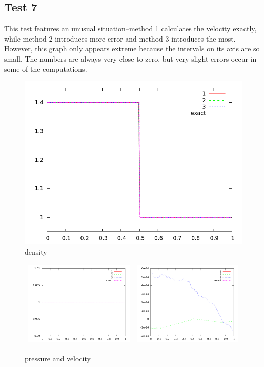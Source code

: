 \documentclass[10pt,preprint]{aastex}
\begin{document}
\clearpage

\subsection{Test 7}
This test features an unusual situation--method 1 calculates the velocity exactly, while method 2 introduces more error and method 3 introduces the most. However, this graph only appears extreme because the intervals on its axis are so small. The numbers are always very close to zero, but very slight errors occur in some of the computations. 

\begin{figure}[h]
  \begin{center}
     \includegraphics[width=.78\textwidth]{den_T7.png}	
  \end{center}
  \caption{density}
\end{figure}

\begin{figure}
  \begin{center}
	\begin{tabular}{cc}
      \includegraphics[width=.425\textwidth]{prs_T7.png} &
	  \includegraphics[width=.425\textwidth]{vel_T7.png}
	\end{tabular}
  \end{center}
  \caption{pressure and velocity}
\end{figure}
\end{document}
